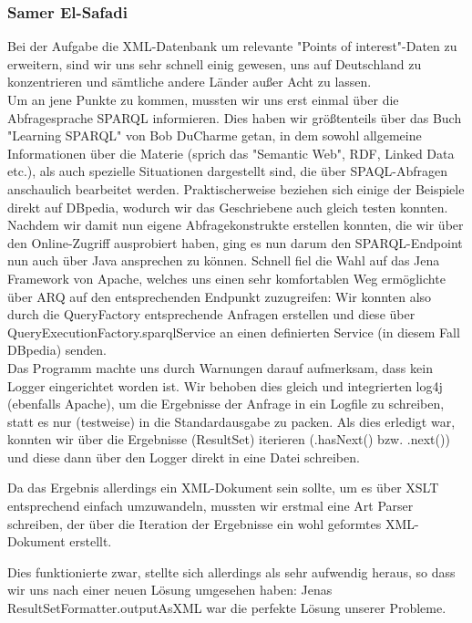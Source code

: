 \subsubsection{Samer El-Safadi}
Bei der Aufgabe die XML-Datenbank um relevante "Points of interest"-Daten
zu erweitern, sind wir uns sehr schnell einig gewesen, uns auf Deutschland
zu konzentrieren und sämtliche andere Länder außer Acht zu lassen.\\

Um an jene Punkte zu kommen, mussten wir uns erst einmal über die
Abfragesprache SPARQL informieren. Dies haben wir größtenteils über das
Buch "Learning SPARQL" von Bob DuCharme getan, in dem sowohl allgemeine
Informationen über die Materie (sprich das "Semantic Web", RDF, Linked
Data etc.), als auch spezielle Situationen dargestellt sind, die über
SPAQL-Abfragen anschaulich bearbeitet werden. Praktischerweise beziehen
sich einige der Beispiele direkt auf DBpedia, wodurch wir das Geschriebene
auch gleich testen konnten.\\

Nachdem wir damit nun eigene Abfragekonstrukte erstellen konnten, die wir
über den Online-Zugriff ausprobiert haben, ging es nun darum den
SPARQL-Endpoint nun auch über Java ansprechen zu können. Schnell fiel die
Wahl auf das Jena Framework von Apache, welches uns einen sehr
komfortablen Weg ermöglichte über ARQ auf den entsprechenden Endpunkt
zuzugreifen: Wir konnten also durch die QueryFactory entsprechende
Anfragen erstellen und diese über QueryExecutionFactory.sparqlService an
einen definierten Service (in diesem Fall DBpedia) senden.\\

Das Programm machte uns durch Warnungen darauf aufmerksam, dass kein
Logger eingerichtet worden ist. Wir behoben dies gleich und integrierten
log4j (ebenfalls Apache), um die Ergebnisse der Anfrage in ein Logfile zu
schreiben, statt es nur (testweise) in die Standardausgabe zu packen.
Als dies erledigt war, konnten wir über die Ergebnisse (ResultSet)
iterieren (.hasNext() bzw. .next()) und diese dann über den Logger direkt
in eine Datei schreiben.

Da das Ergebnis allerdings ein XML-Dokument sein sollte, um es über XSLT
entsprechend einfach umzuwandeln, mussten wir erstmal eine Art Parser
schreiben, der über die Iteration der Ergebnisse ein wohl geformtes
XML-Dokument erstellt.

Dies funktionierte zwar, stellte sich allerdings als sehr aufwendig
heraus, so dass wir uns nach einer neuen Lösung umgesehen haben: Jenas
ResultSetFormatter.outputAsXML war die perfekte Lösung unserer Probleme.\\

